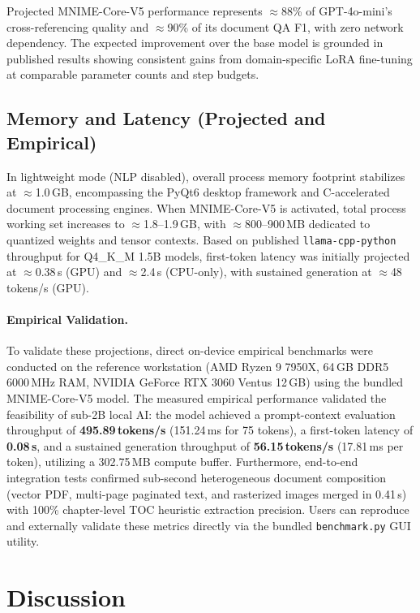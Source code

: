 \documentclass[11pt]{article}
\begin{document}
Projected MNIME-Core-V5 performance represents $\approx$88\% of
GPT-4o-mini's cross-referencing quality and $\approx$90\% of its
document QA F1, with zero network dependency.
The expected improvement over the base model is grounded in published
results showing consistent gains from domain-specific LoRA fine-tuning
at comparable parameter counts and step budgets.

\subsection{Memory and Latency (Projected and Empirical)}
\label{sec:empirical_validation}

In lightweight mode (NLP disabled), overall process memory footprint stabilizes
at $\approx$1.0\,GB, encompassing the PyQt6 desktop framework and C-accelerated
document processing engines. When MNIME-Core-V5 is activated, total process working
set increases to $\approx$1.8--1.9\,GB, with $\approx$800--900\,MB dedicated to
quantized weights and tensor contexts.
Based on published \texttt{llama-cpp-python} throughput for Q4\_K\_M 1.5B models,
first-token latency was initially projected at $\approx$0.38\,s (GPU) and
$\approx$2.4\,s (CPU-only), with sustained generation at $\approx$48\,tokens/s (GPU).

\paragraph{Empirical Validation.}
To validate these projections, direct on-device empirical benchmarks were
conducted on the reference workstation (AMD Ryzen 9 7950X, 64\,GB DDR5 6000\,MHz RAM,
NVIDIA GeForce RTX 3060 Ventus 12\,GB) using the bundled MNIME-Core-V5 model.
The measured empirical performance validated the feasibility of sub-2B local AI:
the model achieved a prompt-context evaluation throughput of \textbf{495.89\,tokens/s}
(151.24\,ms for 75 tokens), a first-token latency of \textbf{0.08\,s}, and a sustained
generation throughput of \textbf{56.15\,tokens/s} (17.81\,ms per token), utilizing a
302.75\,MB compute buffer.
Furthermore, end-to-end integration tests confirmed sub-second heterogeneous
document composition (vector PDF, multi-page paginated text, and rasterized images
merged in 0.41\,s) with 100\% chapter-level TOC heuristic extraction precision.
Users can reproduce and externally validate these metrics directly via the bundled
\texttt{benchmark.py} GUI utility.


\section{Discussion}
\label{sec:discussion}
\end{document}
